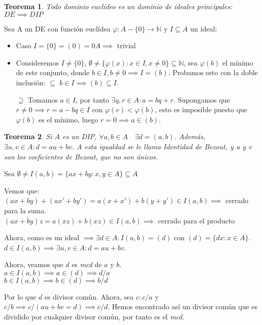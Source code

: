 \documentclass[11pt, a4paper, titlepage]{article}
\makeatletter
\renewenvironment{proof}[1][\proofname] {\vspace{-15pt}\par\pushQED{\qed}\normalfont\topsep6\p@\@plus6\p@\relax\trivlist\item[\hskip\labelsep\it#1\@addpunct{.}]\ignorespaces}{\popQED\endtrivlist\@endpefalse}
\theoremstyle{theorem-style}
\newtheorem*{nth}{Teorema}
\theoremstyle{definition-style}
\theoremstyle{remark-style}
\theoremstyle{example-style}
\makeatother
\begin{document}
\begin{nth}
	Todo dominio euclídeo es un dominio de ideales principales: $DE \implies DIP$
\end{nth}
\begin{proof}
	Sea A un DE con función euclídea $\varphi: A-\{ 0 \} \longrightarrow \mathbb{N}$ y $I\subseteq A$ un ideal:
	\begin{itemize}
		\item Caso $I=\{ 0 \} = (0)= 0A \implies $ trivial
		\item Consideremos $I\neq \{ 0\}$, $\emptyset \neq \{ \varphi (x): x\in I, x\neq 0\} \subseteq \mathbb{N}$, sea $\varphi (b)$ el mínimo de este conjunto, donde $b\in I, b\neq 0 \implies I=(b)$. Probamos esto con la doble inclusión:
		  $\boxed{\subseteq}$ $b\in I \implies (b)\subseteq I$.
                  
		$\boxed{\supseteq}$ Tomamos $a\in I$, por tanto $\exists q,r\in A: a=bq+r$. Supongamos que $r\neq 0 \implies r=a-bq\in I$ con $\varphi (r) < \varphi (b)$, esto es imposible puesto que $\varphi(b)$ es el mínimo, luego $r=0 \implies a\in (b)$.
	\end{itemize}
\end{proof}


\begin{nth}
	Si $A$ es un DIP, $\forall a,b \in A \quad \exists d = (a,b)$. Además, $\exists u,v \in A : d = au+bv$. A esta igualdad se le llama Identidad de Bezout, y u y v son los coeficientes de Bezout, que no son únicos.
	
\end{nth}

\begin{proof}
	Sea $\emptyset \ne I(a,b) = \{ax + by : x,y \in A\} \subseteq A$
	
	Vemos que:\\
$(ax+by)+(ax'+by') = a(x+x') + b(y+y') \in I(a,b) \implies$ cerrado para la suma.\\
$(ax+by)z = a(xz)+b(xz) \in I(a,b) \implies$ cerrado para el producto

Ahora, como es un ideal $\implies \exists d\in A : I(a,b) = (d)$ con $(d)=\{dx: x \in A\}$.
$d\in I(a,b) \implies \exists u,v \in A : d=au+bv$.

Ahora, veamos que $d$ es \textit{mcd} de $a$ y $b$.\\
$a\in I(a,b) \implies a \in (d) \implies d/a$\\
$b\in I(a,b) \implies b \in (d) \implies b/d$

Por lo que $d$ es divisor común. Ahora, sea $c: c/a$ y $c/b \implies c/(au+bv=d) \implies c/d$.
Hemos encontrado así un divisor común que es dividido por cualquier divisor común, por tanto es el \textit{mcd}. 
\end{proof}
\end{document}
